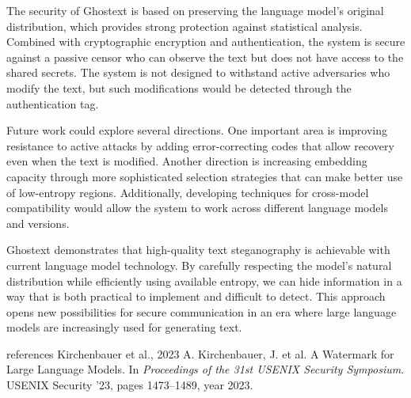 \documentclass[sigconf,review,anonymous]{acmart}
\begin{document}
The security of Ghostext is based on preserving the language model's original distribution, which provides strong protection against statistical analysis. Combined with cryptographic encryption and authentication, the system is secure against a passive censor who can observe the text but does not have access to the shared secrets. The system is not designed to withstand active adversaries who modify the text, but such modifications would be detected through the authentication tag.

Future work could explore several directions. One important area is improving resistance to active attacks by adding error-correcting codes that allow recovery even when the text is modified. Another direction is increasing embedding capacity through more sophisticated selection strategies that can make better use of low-entropy regions. Additionally, developing techniques for cross-model compatibility would allow the system to work across different language models and versions.

Ghostext demonstrates that high-quality text steganography is achievable with current language model technology. By carefully respecting the model's natural distribution while efficiently using available entropy, we can hide information in a way that is both practical to implement and difficult to detect. This approach opens new possibilities for secure communication in an era where large language models are increasingly used for generating text.

\begin{thebibliography}{references}
\bibitem[ACM] Kirchenbauer et al., 2023
A. Kirchenbauer, J. et al.
\newblock A Watermark for Large Language Models.
In {\em Proceedings of the 31st USENIX Security Symposium}.
USENIX Security '23,
pages 1473--1489,
year 2023.
\endbibitem

\end{thebibliography}
\end{document}
